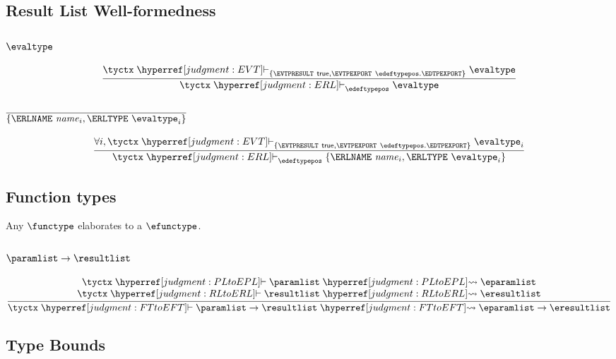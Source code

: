 \subsection{Result List Well-formedness}
\label{judgment:ERL}

\subsubsection{$\evaltype$}
\[
  \frac{
    \tyctx \vdashh!EVT!_{\{\EVTPRESULT~\true,\EVTPEXPORT~\edeftypepos.\EDTPEXPORT\}} \evaltype
  }{
    \tyctx \vdashh!ERL!_\edeftypepos \evaltype
  }
\]

\subsubsection{$\overline{\{\ERLNAME~\name_i, \ERLTYPE~\evaltype_i\}}$}
\[
  \frac{
    \forall i, \tyctx \vdashh!EVT!_{\{\EVTPRESULT~\true,\EVTPEXPORT~\edeftypepos.\EDTPEXPORT\}} \evaltype_i
  }{
    \tyctx \vdashh!ERL!_\edeftypepos \{\ERLNAME~\name_i, \ERLTYPE~\evaltype_i\}
  }
\]

\subsection{Function types}
\label{judgment:FTtoEFT}

Any $\functype$ elaborates to a $\efunctype$.

\subsubsection{$\paramlist \to \resultlist$}
\[
  \frac{
    \begin{array}{@{}c@{}}
      \tyctx \vdashh!PLtoEPL! \paramlist \leadstoh!PLtoEPL! \eparamlist\\
      \tyctx \vdashh!RLtoERL! \resultlist \leadstoh!RLtoERL! \eresultlist\\
    \end{array}
  }{
    \tyctx \vdashh!FTtoEFT! \paramlist\to\resultlist
    \leadstoh!FTtoEFT! \eparamlist\to\eresultlist
  }
\]

\subsection{Type Bounds}
\label{judgment:TBtoETB}

